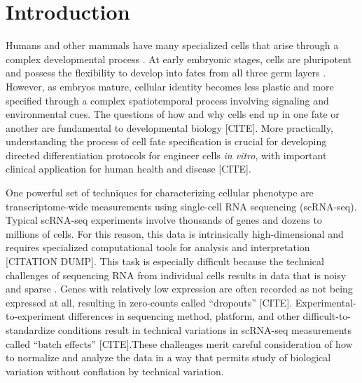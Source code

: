 \documentclass[aps,superscriptaddress, notitlepage,longbibliography]{revtex4-1}
\begin{document}
\maketitle

\section{Introduction}
Humans and other mammals have many specialized cells that arise through a complex developmental process  \cite{zeng_what_2022}. At early embryonic stages, cells are pluripotent and possess the flexibility to develop into fates from all three germ layers \cite{Wolpert_2019}. However, as embryos mature, cellular identity becomes less plastic and more specified through a complex spatiotemporal process involving signaling and environmental cues. The questions of how and why cells end up in one fate or another are fundamental to developmental biology [CITE]. More practically, understanding the process of cell fate specification is crucial for developing directed differentiation protocols for engineer cells \emph{in vitro}, with important clinical application for human health and disease [CITE].

One powerful set of techniques for characterizing cellular phenotype are transcriptome-wide measurements using single-cell RNA sequencing (scRNA-seq). Typical scRNA-seq experiments involve thousands of genes and dozens to millions of cells. For this reason, this data is intrinsically high-dimensional and requires specialized computational tools for analysis and interpretation [CITATION DUMP]. This task is especially difficult because the technical challenges of sequencing RNA from individual cells results in data that is noisy and sparse \cite{lahnemann_eleven_2020}. Genes with relatively low expression are often recorded as not being expressed at all, resulting in zero-counts called ``dropouts'' [CITE]. Experimental-to-experiment differences in sequencing method, platform, and other difficult-to-standardize conditions result in technical variations in scRNA-seq measurements called ``batch effects'' [CITE].These challenges merit careful consideration of how to normalize and analyze the data in a way that permits study of biological variation without conflation by technical variation.
\end{document}
